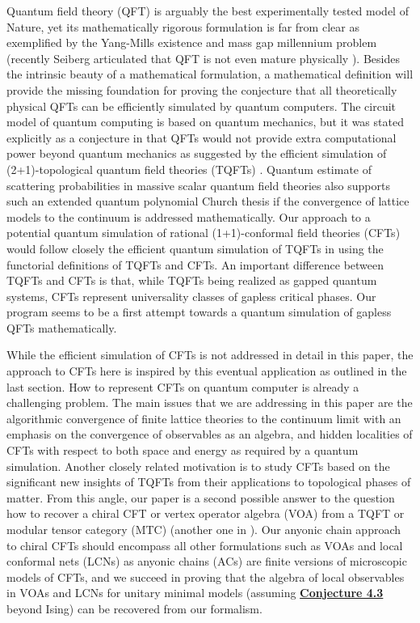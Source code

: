 \documentclass[twoside,11pt,titlepage]{amsart}
\renewcommand{\=}[1]{\stackrel{#1}{=}} %
\theoremstyle{definition}
\theoremstyle{remark}
\begin{document}
Quantum field theory (QFT) is arguably the best experimentally tested model of Nature, yet its mathematically rigorous formulation is far from clear as exemplified by the Yang-Mills existence and mass gap millennium problem (recently Seiberg articulated that QFT is not even mature physically \cite{seibergQFT}).  Besides the intrinsic beauty of a mathematical formulation, a mathematical definition will provide the missing foundation for proving the conjecture that all theoretically physical QFTs can be efficiently simulated by quantum computers.
The circuit model of quantum computing is based on quantum mechanics, but it was stated explicitly as a conjecture in \cite{tqc03} that QFTs would not provide extra computational power beyond quantum mechanics as suggested by the efficient simulation of (2+1)-topological quantum field theories (TQFTs) \cite{simulation02}.  Quantum estimate of scattering probabilities in massive scalar quantum field theories also supports such an extended quantum polynomial Church thesis \cite{jordan12} if the convergence of lattice models to the continuum is addressed mathematically.  Our approach to a potential quantum simulation of rational (1+1)-conformal field theories (CFTs) would follow closely the efficient quantum simulation of TQFTs in \cite{simulation02} using the functorial definitions of TQFTs and CFTs.  An important difference between TQFTs and CFTs is that, while TQFTs being realized as gapped quantum systems, CFTs represent universality classes of gapless critical phases.  Our program seems to be a first attempt towards a quantum simulation of gapless QFTs mathematically.

While the efficient simulation of CFTs is not addressed in detail in this paper, the approach to CFTs here is inspired by this eventual application as outlined in the last section.  How to represent CFTs on quantum computer is already a challenging problem.  The main issues that we are addressing in this paper are the algorithmic convergence of finite lattice theories to the continuum limit with an emphasis on the convergence of observables as an algebra, and hidden localities of CFTs with respect to both space and energy as required by a quantum simulation.  Another closely related motivation is to study CFTs based on the significant new insights of TQFTs from their applications to topological phases of matter. From this angle, our paper is a second possible answer to the question how to recover a chiral CFT or vertex operator algebra (VOA) from a TQFT or modular tensor category (MTC) (another one in \cite{tener16}).  Our anyonic chain approach to chiral CFTs should encompass all other formulations such as VOAs and local conformal nets (LCNs) as anyonic chains (ACs) are finite versions of microscopic models of CFTs, and we succeed in proving that the algebra of local observables in VOAs and LCNs for unitary minimal models (assuming \hyperref[cnj4.3]{\textbf{Conjecture 4.3}} beyond Ising) can be recovered from our formalism.
\end{document}
